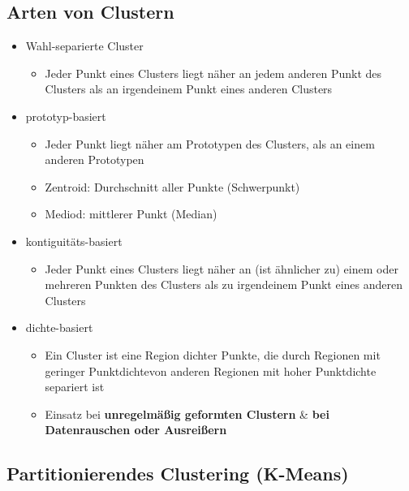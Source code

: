\documentclass[a4paper]{article}
\begin{document}
\begin{landscape}
\begin{multicols}{3}
    \subsection{Arten von Clustern}
    \begin{itemize}[noitemsep,nolistsep]
        \item Wahl-separierte Cluster
            \begin{itemize}
                \item Jeder Punkt eines Clusters liegt näher an jedem anderen Punkt des Clusters als an irgendeinem Punkt eines anderen Clusters
            \end{itemize}
        \item prototyp-basiert
            \begin{itemize}[noitemsep,nolistsep]
                \item Jeder Punkt liegt näher am Prototypen des Clusters, als an einem anderen Prototypen
                \item Zentroid: Durchschnitt aller Punkte (Schwerpunkt)
                \item Mediod: mittlerer Punkt (Median)
            \end{itemize}
        \item kontiguitäts-basiert
            \begin{itemize}[noitemsep,nolistsep]
                \item Jeder Punkt eines Clusters liegt näher an (ist ähnlicher zu) einem oder mehreren Punkten des Clusters als zu irgendeinem Punkt eines anderen Clusters
            \end{itemize}
        \item dichte-basiert
        \begin{itemize}[noitemsep,nolistsep]
            \item Ein Cluster ist eine Region dichter Punkte, die durch Regionen mit geringer Punktdichtevon anderen Regionen mit hoher Punktdichte separiert ist
            \item Einsatz bei \textbf{unregelmäßig geformten Clustern} \& \textbf{bei Datenrauschen oder Ausreißern}
        \end{itemize}
    \end{itemize}

    \subsection{Partitionierendes Clustering (K-Means)}

\end{multicols}
\end{landscape}
\end{document}
